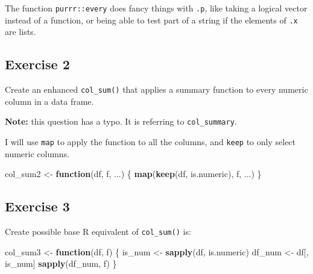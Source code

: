 \documentclass[]{book}
\newenvironment{Shaded}{\begin{snugshade}}{\end{snugshade}}
\newcommand{\CommentTok}[1]{\textcolor[rgb]{0.56,0.35,0.01}{\textit{#1}}}
\newcommand{\ControlFlowTok}[1]{\textcolor[rgb]{0.13,0.29,0.53}{\textbf{#1}}}
\newcommand{\KeywordTok}[1]{\textcolor[rgb]{0.13,0.29,0.53}{\textbf{#1}}}
\newcommand{\NormalTok}[1]{#1}
\newcommand{\StringTok}[1]{\textcolor[rgb]{0.31,0.60,0.02}{#1}}
\theoremstyle{plain}
\theoremstyle{remark}
\theoremstyle{definition}
\theoremstyle{definition}
\theoremstyle{definition}
\theoremstyle{remark}
\begin{document}
The function \texttt{purrr::every} does fancy things with \texttt{.p},
like taking a logical vector instead of a function, or being able to
test part of a string if the elements of \texttt{.x} are lists.

\hypertarget{exercise-2-59}{%
\subsection{Exercise 2}\label{exercise-2-59}}

Create an enhanced \texttt{col\_sum()} that applies a summary function
to every numeric column in a data frame.

\textbf{Note:} this question has a typo. It is referring to
\texttt{col\_summary}.

I will use \texttt{map} to apply the function to all the columns, and
\texttt{keep} to only select numeric columns.

\begin{Shaded}
\begin{Highlighting}[]
\NormalTok{col_sum2 <-}\StringTok{ }\ControlFlowTok{function}\NormalTok{(df, f, ...) \{}
  \KeywordTok{map}\NormalTok{(}\KeywordTok{keep}\NormalTok{(df, is.numeric), f, ...)}
\NormalTok{\}}
\end{Highlighting}
\end{Shaded}

\begin{Shaded}
\end{Shaded}

\hypertarget{exercise-3-47}{%
\subsection{Exercise 3}\label{exercise-3-47}}

Create possible base R equivalent of \texttt{col\_sum()} is:

\begin{Shaded}
\begin{Highlighting}[]
\NormalTok{col_sum3 <-}\StringTok{ }\ControlFlowTok{function}\NormalTok{(df, f) \{}
\NormalTok{  is_num <-}\StringTok{ }\KeywordTok{sapply}\NormalTok{(df, is.numeric)}
\NormalTok{  df_num <-}\StringTok{ }\NormalTok{df[, is_num]}
  \KeywordTok{sapply}\NormalTok{(df_num, f)}
\NormalTok{\}}
\end{Highlighting}
\end{Shaded}
\end{document}
